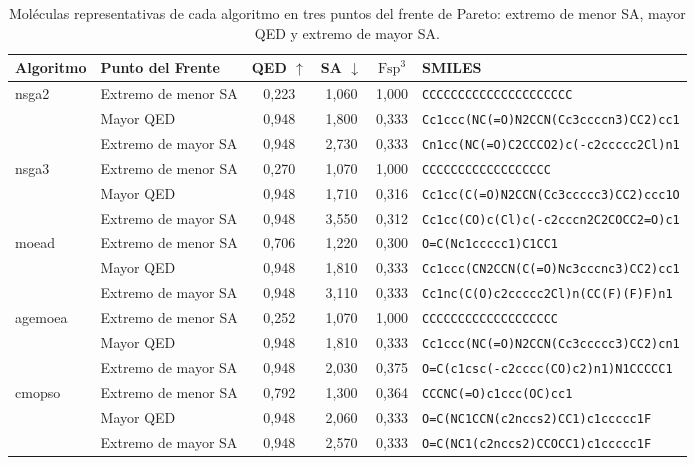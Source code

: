 \begin{table}[H]
\centering
\caption{Moléculas representativas de cada algoritmo en tres puntos del frente de Pareto: extremo de menor SA, mayor QED y extremo de mayor SA.}
\label{tab:moleculas_representativas}
\begin{tabular}{llcccl}
\toprule
Algoritmo & Punto del Frente & QED $\uparrow$ & SA $\downarrow$ & $\text{Fsp}^3$ & SMILES \\
\midrule
\multirow{3}{*}{\acrshort{nsga2}}
 & Extremo de menor SA & 0,223 & 1,060 & 1,000 & \texttt{CCCCCCCCCCCCCCCCCCCCC} \\
 & Mayor QED & 0,948 & 1,800 & 0,333 & \texttt{Cc1ccc(NC(=O)N2CCN(Cc3ccccn3)CC2)cc1} \\
 & Extremo de mayor SA & 0,948 & 2,730 & 0,333 & \texttt{Cn1cc(NC(=O)C2CCCO2)c(-c2ccccc2Cl)n1} \\
\midrule
\multirow{3}{*}{\acrshort{nsga3}}
 & Extremo de menor SA & 0,270 & 1,070 & 1,000 & \texttt{CCCCCCCCCCCCCCCCCC} \\
 & Mayor QED & 0,948 & 1,710 & 0,316 & \texttt{Cc1cc(C(=O)N2CCN(Cc3ccccc3)CC2)ccc1O} \\
 & Extremo de mayor SA & 0,948 & 3,550 & 0,312 & \texttt{Cc1cc(CO)c(Cl)c(-c2cccn2C2COCC2=O)c1} \\
\midrule
\multirow{3}{*}{\acrshort{moead}}
 & Extremo de menor SA & 0,706 & 1,220 & 0,300 & \texttt{O=C(Nc1ccccc1)C1CC1} \\
 & Mayor QED & 0,948 & 1,810 & 0,333 & \texttt{Cc1ccc(CN2CCN(C(=O)Nc3cccnc3)CC2)cc1} \\
 & Extremo de mayor SA & 0,948 & 3,110 & 0,333 & \texttt{Cc1nc(C(O)c2ccccc2Cl)n(CC(F)(F)F)n1} \\
\midrule
\multirow{3}{*}{\acrshort{agemoea}}
 & Extremo de menor SA & 0,252 & 1,070 & 1,000 & \texttt{CCCCCCCCCCCCCCCCCCC} \\
 & Mayor QED & 0,948 & 1,810 & 0,333 & \texttt{Cc1ccc(NC(=O)N2CCN(Cc3ccccc3)CC2)cn1} \\
 & Extremo de mayor SA & 0,948 & 2,030 & 0,375 & \texttt{O=C(c1csc(-c2cccc(CO)c2)n1)N1CCCCC1} \\
\midrule
\multirow{3}{*}{\acrshort{cmopso}}
 & Extremo de menor SA & 0,792 & 1,300 & 0,364 & \texttt{CCCNC(=O)c1ccc(OC)cc1} \\
 & Mayor QED & 0,948 & 2,060 & 0,333 & \texttt{O=C(NC1CCN(c2nccs2)CC1)c1ccccc1F} \\
 & Extremo de mayor SA & 0,948 & 2,570 & 0,333 & \texttt{O=C(NC1(c2nccs2)CCOCC1)c1ccccc1F} \\
\bottomrule
\end{tabular}
\end{table}

